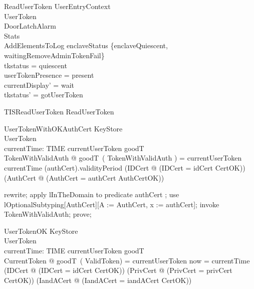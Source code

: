 \begin{schema}{ReadUserToken}
  UserEntryContext\\
  \Xi UserToken\\
  \Xi DoorLatchAlarm\\
  \Xi Stats\\
  AddElementsToLog
\where
  enclaveStatus \in  \{enclaveQuiescent, waitingRemoveAdminTokenFail\}\\
  tkstatus = quiescent\\
  userTokenPresence = present\\
  currentDisplay' = wait\\
  tkstatus' = gotUserToken
\end{schema}

\begin{zed}
TISReadUserToken  ReadUserToken
\end{zed}

\begin{schema}{UserTokenWithOKAuthCert}
  KeyStore\\
  UserToken\\
  currentTime: TIME
\where
  currentUserToken \in  \ran  goodT\\
  \exists  TokenWithValidAuth @ goodT~( \theta  TokenWithValidAuth ) = currentUserToken \land  currentTime \in  (\The authCert).validityPeriod \land  (\exists  IDCert @ (\theta  IDCert = idCert \land  CertOK)) \land  (\exists  AuthCert @ (\theta  AuthCert = \The authCert \land  AuthCertOK))
\end{schema}

\begin{zproof}
rewrite;
apply lInTheDomain to predicate authCert \in  \dom  \The;
use lOptionalSubtyping[AuthCert][A := AuthCert, x := authCert];
invoke TokenWithValidAuth;
prove;
\end{zproof}

\begin{schema}{UserTokenOK}
  KeyStore\\
  UserToken\\
  currentTime: TIME
\where
  currentUserToken \in  \ran  goodT\\
  \exists  CurrentToken @ goodT~( \theta  ValidToken) = currentUserToken \land  now = currentTime \land  (\exists  IDCert @ (\theta  IDCert = idCert \land  CertOK)) \land  (\exists  PrivCert @ (\theta  PrivCert = privCert \land  CertOK)) \land  (\exists  IandACert @ (\theta  IandACert = iandACert \land  CertOK))
\end{schema}

